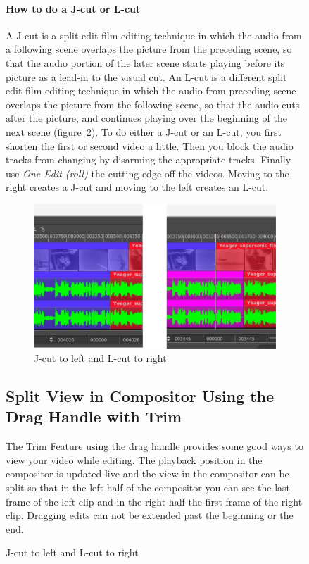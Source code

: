 \begin{figure}
\paragraph{How to do a J-cut or L-cut} A J-cut is a split edit film editing technique in which the audio from a following scene overlaps the picture from the preceding scene, so that the audio portion of the later scene starts playing before its picture as a lead-in to the visual cut.  An L-cut is a different split edit film editing technique in which the audio from preceding scene overlaps the picture from the following scene, so that the audio cuts after the picture, and continues playing over the beginning of the next scene (figure~\ref{fig:j-cut}). To do either a J-cut or an L-cut, you first shorten the first or second video a little.  Then you block the audio tracks from changing by disarming the appropriate tracks.  Finally use \textit{One Edit (roll)} the cutting edge off the videos.  Moving to the right creates a J-cut and moving to the left creates an L-cut.
\begin{figure}[htpb]
    \centering
    \includegraphics[width=0.8\linewidth]{images/j-cut.png}
    \caption{J-cut to left and L-cut to right}
    \label{fig:j-cut}
\end{figure}

\subsection{Split View in Compositor Using the Drag Handle with Trim}%
\label{sub:split_view_compositor_using_drag_trim}

The Trim Feature using the drag handle provides some good ways to view your video while editing.  The playback position in the compositor is updated live and the view in the compositor can be split so that in the left half of the compositor you can see the last frame of the left clip and in the right half the first frame of the right clip.  Dragging edits can not be extended past the beginning or the end.


\end{figure}
